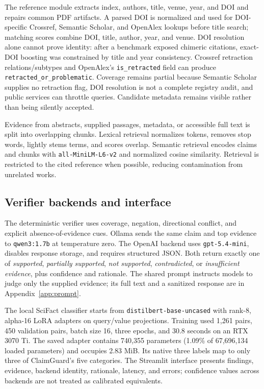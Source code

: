 \documentclass[12pt,toc=bib,toc=listof]{scrartcl}
\begin{document}
The reference module extracts index, authors, title, venue, year, and DOI and repairs common PDF artifacts. A parsed DOI is normalized and used for DOI-specific Crossref, Semantic Scholar, and OpenAlex lookups before title search; matching scores combine DOI, title, author, year, and venue. DOI resolution alone cannot prove identity: after a benchmark exposed chimeric citations, exact-DOI boosting was constrained by title and year consistency. Crossref retraction relations/subtypes and OpenAlex's \texttt{is\_retracted} field can produce \texttt{retracted\_or\_problematic}. Coverage remains partial because Semantic Scholar supplies no retraction flag, DOI resolution is not a complete registry audit, and public services can throttle queries. Candidate metadata remains visible rather than being silently accepted.

Evidence from abstracts, supplied passages, metadata, or accessible full text is split into overlapping chunks. Lexical retrieval normalizes tokens, removes stop words, lightly stems terms, and scores overlap. Semantic retrieval encodes claims and chunks with \texttt{all-MiniLM-L6-v2} and normalized cosine similarity. Retrieval is restricted to the cited reference when possible, reducing contamination from unrelated works.

\subsection{Verifier backends and interface}

The deterministic verifier uses coverage, negation, directional conflict, and explicit absence-of-evidence cues. Ollama sends the same claim and top evidence to \texttt{qwen3:1.7b} at temperature zero. The OpenAI backend uses \texttt{gpt-5.4-mini}, disables response storage, and requires structured JSON. Both return exactly one of \emph{supported}, \emph{partially supported}, \emph{not supported}, \emph{contradicted}, or \emph{insufficient evidence}, plus confidence and rationale. The shared prompt instructs models to judge only the supplied evidence; its full text and a sanitized response are in Appendix~\ref{app:prompt}.

The local SciFact classifier starts from \texttt{distilbert-base-uncased} with rank-8, alpha-16 LoRA adapters on query/value projections. Training used 1,261 pairs, 450 validation pairs, batch size 16, three epochs, and 30.8 seconds on an RTX 3070 Ti. The saved adapter contains 740,355 parameters (1.09\% of 67,696,134 loaded parameters) and occupies 2.83 MiB. Its native three labels map to only three of ClaimGuard's five categories. The Streamlit interface presents findings, evidence, backend identity, rationale, latency, and errors; confidence values across backends are not treated as calibrated equivalents.
\end{document}
